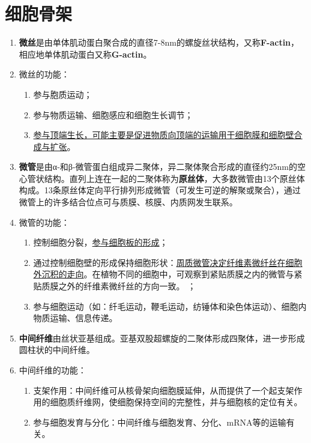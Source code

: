 \section{细胞骨架}
\begin{enumerate}
    \item \textbf{微丝}是由单体肌动蛋白聚合成的直径7-8nm的螺旋丝状结构，又称\textbf{F-actin}，相应地单体肌动蛋白又称\textbf{G-actin}。
    \item 微丝的功能：
    \begin{enumerate}
        \item 参与胞质运动；
        \item 参与物质运输、细胞感应和细胞生长调节；
        \item \uline{参与顶端生长，可能主要是促进物质向顶端的运输用于细胞膜和细胞壁合成与扩张}。
    \end{enumerate}
    \item \textbf{微管}是由α-和β-微管蛋白组成异二聚体，异二聚体聚合形成的直径约25nm的空心管状结构。直列上连在一起的二聚体称为\textbf{原丝体}，大多数微管由13个原丝体构成。13条原丝体定向平行排列形成微管（可发生可逆的解聚或聚合），通过微管上的许多结合位点可与质膜、核膜、内质网发生联系。
    \item 微管的功能：
    \begin{enumerate}
        \item 控制细胞分裂，\uline{参与细胞板的形成}；
        \item 通过控制细胞壁的形成保持细胞形状：\uline{周质微管决定纤维素微纤丝在细胞外沉积的走向}。在植物不同的细胞中，可观察到紧贴质膜之内的微管与紧贴质膜之外的纤维素微纤丝的方向一致。        ；
        \item 参与细胞运动（如：纤毛运动，鞭毛运动，纺锤体和染色体运动）、细胞内物质运输、信息传递。
    \end{enumerate}
    \item \textbf{中间纤维}由丝状亚基组成。亚基双股超螺旋的二聚体形成四聚体，进一步形成圆柱状的中间纤维。
    \item 中间纤维的功能：
    \begin{enumerate}
        \item 支架作用：中间纤维可从核骨架向细胞膜延伸，从而提供了一个起支架作用的细胞质纤维网，使细胞保持空间的完整性，并与细胞核的定位有关。
        \item 参与细胞发育与分化：中间纤维与细胞发育、分化、mRNA等的运输有关。
    \end{enumerate}
\end{enumerate}

